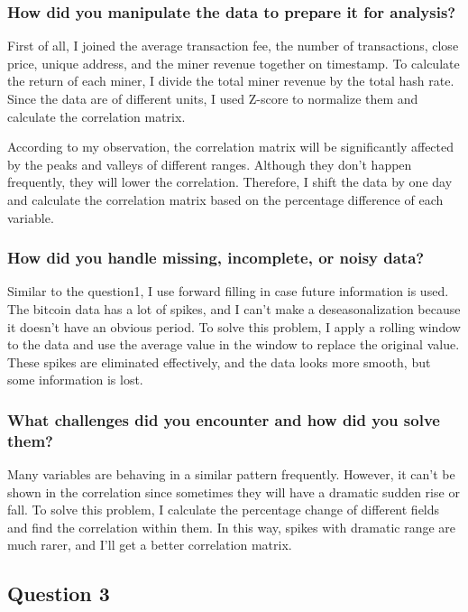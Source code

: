\documentclass[a4paper]{article}
\begin{document}
\subsubsection{How did you manipulate the data to prepare it for analysis?}
    First of all, I joined the average transaction fee, the number of transactions, close price, unique address, and the miner revenue together on timestamp. To calculate the return of each miner, I divide the total miner revenue by the total hash rate. Since the data are of different units, I used Z-score to normalize them and calculate the correlation matrix.
    \par According to my observation, the correlation matrix will be significantly affected by the peaks and valleys of different ranges. Although they don't happen frequently, they will lower the correlation. Therefore, I shift the data by one day and calculate the correlation matrix based on the percentage difference of each variable.
\subsubsection{How did you handle missing, incomplete, or noisy data?}
    Similar to the question1, I use forward filling in case future information is used. The bitcoin data has a lot of spikes, and I can't make a deseasonalization because it doesn't have an obvious period. To solve this problem, I apply a rolling window to the data and use the average value in the window to replace the original value. These spikes are eliminated effectively, and the data looks more smooth, but some information is lost.
\subsubsection{What challenges did you encounter and how did you solve them?}
    Many variables are behaving in a similar pattern frequently. However, it can't be shown in the correlation since sometimes they will have a dramatic sudden rise or fall. To solve this problem, I calculate the percentage change of different fields and find the correlation within them. In this way, spikes with dramatic range are much rarer, and I'll get a better correlation matrix.  
\subsection{Question 3}
\end{document}
